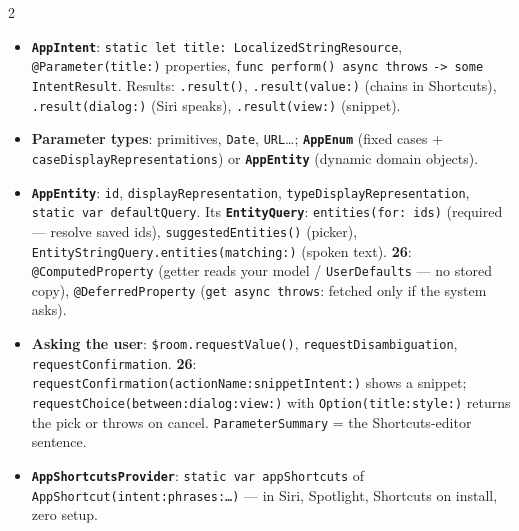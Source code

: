 \documentclass[8pt]{extarticle}
\newcommand\ct[1]{\texttt{#1}}
\newcommand\arr{\texttt{\hbox{-}\hbox{>}}}
\newcommand\hd[1]{\par\vspace{3pt}\noindent{\bfseries\color{sheetBlue}#1}\par\vspace{1pt}}
\newcommand\vv[1]{\textcolor{sheetOrange}{\textbf{#1}}}
\begin{document}


\begin{multicols}{2}
\footnotesize{}\raggedright

\hd{How it works}
\begin{itemize}
  \item \textbf{\texttt{AppIntent}}: \ct{static let title: LocalizedStringResource},
        \ct{@Parameter(title:)} properties, \ct{func perform() async throws} \arr\
        \ct{some IntentResult}. Results: \ct{.result()}, \ct{.result(value:)} (chains in Shortcuts),
        \ct{.result(dialog:)} (Siri speaks), \ct{.result(view:)} (snippet).
  \item \textbf{Parameter types}: primitives, \ct{Date}, \ct{URL}\ldots;
        \textbf{\ct{AppEnum}} (fixed cases + \ct{caseDisplayRepresentations})
        or \textbf{\ct{AppEntity}} (dynamic domain objects).
  \item \textbf{\ct{AppEntity}}: \ct{id}, \ct{displayRepresentation},
        \ct{typeDisplayRepresentation}, \ct{static var defaultQuery}. Its
        \textbf{\ct{EntityQuery}}: \ct{entities(for: ids)} (required — resolve saved ids),
        \ct{suggestedEntities()} (picker), \ct{EntityStringQuery.entities(matching:)} (spoken text).
        \vv{26}: \ct{@ComputedProperty} (getter reads your model / \ct{UserDefaults} — no stored
        copy), \ct{@DeferredProperty} (\ct{get async throws}: fetched only if the system asks).
  \item \textbf{Asking the user}: \ct{\$room.requestValue()}, \ct{requestDisambiguation},
        \ct{requestConfirmation}. \vv{26}: \ct{requestConfirmation(actionName:snippetIntent:)} shows a
        snippet; \ct{requestChoice(between:dialog:view:)} with \ct{Option(title:style:)} returns the
        pick or throws on cancel. \ct{ParameterSummary} = the Shortcuts-editor sentence.
  \item \textbf{\ct{AppShortcutsProvider}}: \ct{static var appShortcuts} of
        \ct{AppShortcut(intent:phrases:\ldots)} — in Siri, Spotlight, Shortcuts on install, zero setup.

\end{itemize}
\end{multicols}
\end{document}
